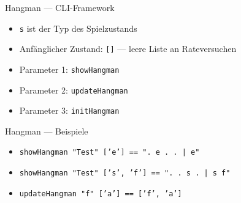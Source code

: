 \documentclass{beamer}
\newcommand{\code}[1]{
	\begin{mdframed}
		
	\end{mdframed}
}
\begin{document}
\begin{frame}{Hangman --- CLI-Framework}
	\code{demos/CLI.hs}

	\begin{itemize}
		\item \texttt{s} ist der Typ des Spielzustands
		\item Anfänglicher Zustand: \texttt{[]} --- leere Liste an Rateversuchen
		\item Parameter 1: \texttt{showHangman}
		\item Parameter 2: \texttt{updateHangman}
		\item Parameter 3: \texttt{initHangman}
	\end{itemize}
\end{frame}

\begin{frame}{Hangman --- Beispiele}
	\begin{itemize}
		\item \texttt{showHangman "Test" ['e'] == ". e . . | e"}
		\item \texttt{showHangman "Test" ['s', 'f'] == ". . s . | s f"}
		\item \texttt{updateHangman "f" ['a'] == ['f', 'a']}
	\end{itemize}
\end{frame}
\end{document}
